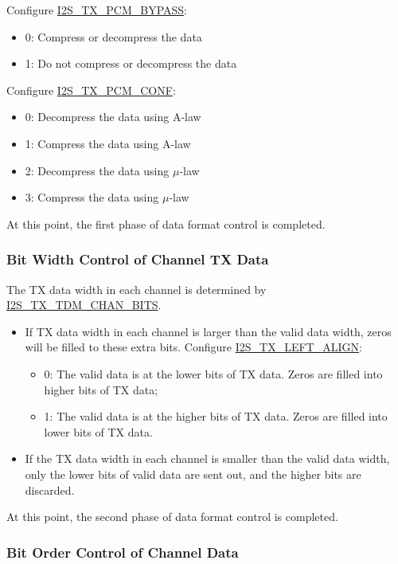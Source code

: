 \documentclass[main\_\_EN.tex]{subfiles}
\begin{document}
Configure \hyperref[fielddesc:I2STXPCMBYPASS]{I2S\_TX\_PCM\_BYPASS}:
\begin{itemize}
\item 0: Compress or decompress the data
\item 1: Do not compress or decompress the data
\end{itemize}
Configure \hyperref[fielddesc:I2STXPCMCONF]{I2S\_TX\_PCM\_CONF}: 
\begin{itemize}
\item 0: Decompress the data using A-law
\item 1: Compress the data using A-law
\item 2: Decompress the data using $\mu$-law
\item 3: Compress the data using $\mu$-law
\end{itemize}

At this point, the first phase of data format control is completed.

\subsubsection{Bit Width Control of Channel TX Data}\label{sec:i2s-tdm-chan-bits}

The TX data width in each channel is determined by \hyperref[fielddesc:I2STXTDMCHANBITS]{I2S\_TX\_TDM\_CHAN\_BITS}.

\begin{itemize}
\item If TX data width in each channel is larger than the valid data width, zeros will be filled to these extra bits. Configure  \hyperref[fielddesc:I2STXLEFTALIGN]{I2S\_TX\_LEFT\_ALIGN}:
\begin{itemize}
\item 0: The valid data is at the lower bits of TX data. Zeros are filled into higher bits of TX data;
\item 1: The valid data is at the higher bits of TX data. Zeros are filled into lower bits of TX data.
\end{itemize}
\item If the TX data width in each channel is smaller than the valid data width, only the lower bits of valid data are sent out, and the higher bits are discarded.
\end{itemize}
At this point, the second phase of data format control is completed.

\subsubsection{Bit Order Control of Channel Data}
\end{document}
